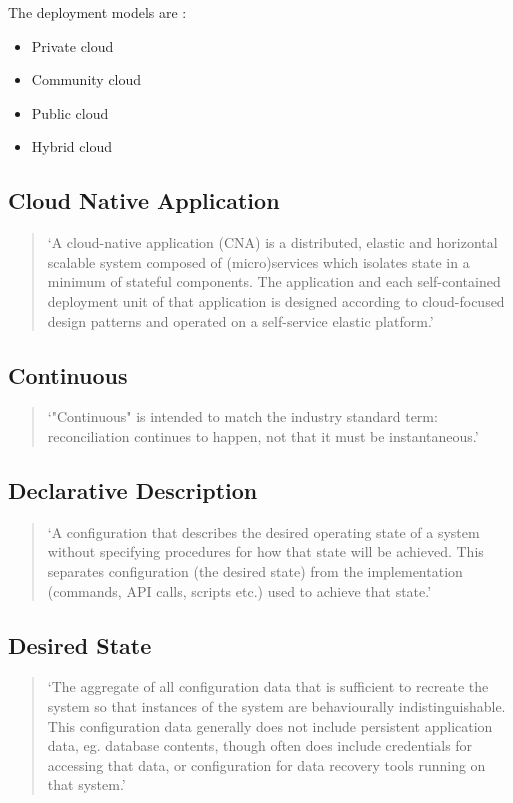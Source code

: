 The deployment models are
\autocite{cloudComputingNistDefinition2011}:

\begin{itemize}
	\item Private cloud
	\item Community cloud
	\item Public cloud
	\item Hybrid cloud
\end{itemize}

\subsection*{Cloud Native Application}

\begin{quotation}
\noindent
\enquote*{A cloud-native application (CNA) is a distributed, elastic and horizontal scalable system composed of (micro)services which isolates state in a
minimum of stateful components. The application and each self-contained
deployment unit of that application is designed according to cloud-focused
design patterns and operated on a self-service elastic platform.}
\autocite{cloudNativeApplicationDefinition2017}
\end{quotation}

\subsection*{Continuous}
\begin{quotation}
\noindent
\enquote*{"Continuous" is intended to match the industry standard term: reconciliation continues to happen, not that it must be instantaneous.}
\autocite{gitopsGlossary}
\end{quotation}

\subsection*{Declarative Description}
\begin{quotation}
\noindent
\enquote*{A configuration that describes the desired operating state of a system without specifying procedures for how that state will be achieved. This separates configuration (the desired state) from the implementation (commands, API calls, scripts etc.) used to achieve that state.}
\autocite{gitopsGlossary}
\end{quotation}

\subsection*{Desired State}
\begin{quotation}
\noindent
\enquote*{The aggregate of all configuration data that is sufficient to recreate the system so that instances of the system are behaviourally indistinguishable. This configuration data generally does not include persistent application data, eg. database contents, though often does include credentials for accessing that data, or configuration for data recovery tools running on that system.}
\autocite{gitopsGlossary}
\end{quotation}

